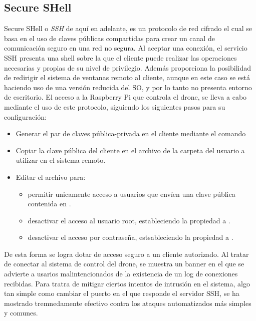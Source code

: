 \subsection{Secure SHell}
\label{subsec:ssh}
Secure SHell o \textit{SSH} \citep{wiki:SSH} de aquí en adelante, es un protocolo de red cifrado el cual se basa en el uso de claves públicas compartidas para crear un canal de comunicación seguro en una red no segura. Al aceptar una conexión, el servicio SSH presenta una shell sobre la que el cliente puede realizar las operaciones necesarias y propias de su nivel de privilegio. Además proporciona la posibilidad de redirigir el sistema de ventanas remoto al cliente, aunque en este caso se está haciendo uso de una versión reducida del SO, y por lo tanto no presenta entorno de escritorio. El acceso a la Raspberry Pi que controla el drone, se lleva a cabo mediante el uso de este protocolo, siguiendo los siguientes pasos para su configuración:
\begin{itemize}
\item Generar el par de claves pública-privada en el cliente mediante el comando 
\item Copiar la clave pública del cliente en el archivo  de la carpeta  del usuario a utilizar en el sistema remoto.
\item Editar el archivo  para:
	\begin{itemize}
	\item permitir unicamente acceso a usuarios que envíen una clave pública contenida en .
	\item desactivar el acceso al usuario root, estableciendo la propiedad  a .
	\item desactivar el acceso por contraseña, estsableciendo la propiedad  a .
	\end{itemize}	 
\end{itemize} 

De esta forma se logra dotar de acceso seguro a un cliente autorizado. Al tratar de conectar al sistema de control del drone, se muestra un banner en el que se advierte a usarios malintencionados de la existencia de un log de conexiones recibidas. 
Para tratra de mitigar ciertos intentos de intrusión en el sistema, algo tan simple como cambiar el puerto en el que responde el servidor SSH, se ha mostrado tremnedamente efectivo contra los ataques automatizados más simples y comunes.

